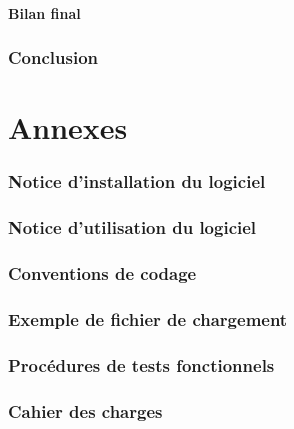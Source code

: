 \documentclass[paper=a4, fontsize=12pt]{article}
\newenvironment{changemargin}[2]{\begin{list}{}{%
      \setlength{\topsep}{0pt}%
      \setlength{\leftmargin}{0pt}%
      \setlength{\rightmargin}{0pt}%
      \setlength{\listparindent}{\parindent}%
      \setlength{\itemindent}{\parindent}%
      \setlength{\parsep}{0pt plus 1pt}%
      \addtolength{\leftmargin}{#1}%
      \addtolength{\rightmargin}{#2}%
    }\item }{\end{list}}
\numberwithin{equation}{section}		%
\numberwithin{figure}{section}			%
\numberwithin{table}{section}				%
\begin{document}
\begin{changemargin}{-1cm}{-1cm}
  \subsection{Bilan final}
  
  \newpage

  \section{Conclusion}
  
  \newpage

  
  
  \newpage

  \appendix
  \part*{Annexes}
  \section{Notice d'installation du logiciel}%
   
  \newpage 
  \section{Notice d'utilisation du logiciel}%
  
  \newpage
  \section{Conventions de codage}%
   
  \newpage 
  \section{Exemple de fichier de chargement}
    
  \newpage
  \section{Procédures de tests fonctionnels}
    
  \newpage
  \section{Cahier des charges}
    
  \newpage
  

  


\end{changemargin}

\end{document}
